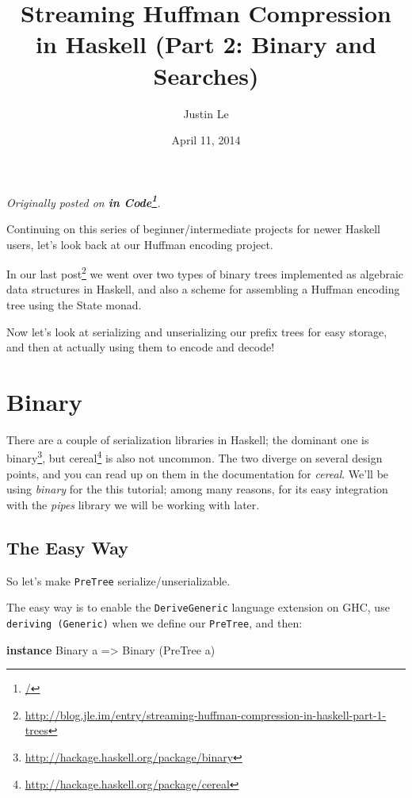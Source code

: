 \documentclass[]{article}
\title{Streaming Huffman Compression in Haskell (Part 2: Binary and Searches)}
\author{Justin Le}
\date{April 11, 2014}
\newenvironment{Shaded}{}{}
\newcommand{\KeywordTok}[1]{\textcolor[rgb]{0.00,0.44,0.13}{\textbf{{#1}}}}
\newcommand{\DataTypeTok}[1]{\textcolor[rgb]{0.56,0.13,0.00}{{#1}}}
\newcommand{\OtherTok}[1]{\textcolor[rgb]{0.00,0.44,0.13}{{#1}}}
\newcommand{\NormalTok}[1]{{#1}}
\renewcommand{\href}[2]{#2\footnote{\url{#1}}}
\begin{document}
\maketitle

\emph{Originally posted on \textbf{\href{/}{in Code}}.}

Continuing on this series of beginner/intermediate projects for newer
Haskell users, let's look back at our Huffman encoding project.

In our
\href{http://blog.jle.im/entry/streaming-huffman-compression-in-haskell-part-1-trees}{last
post} we went over two types of binary trees implemented as algebraic
data structures in Haskell, and also a scheme for assembling a Huffman
encoding tree using the State monad.

Now let's look at serializing and unserializing our prefix trees for
easy storage, and then at actually using them to encode and decode!

\section{Binary}\label{binary}

There are a couple of serialization libraries in Haskell; the dominant
one is \href{http://hackage.haskell.org/package/binary}{binary}, but
\href{http://hackage.haskell.org/package/cereal}{cereal} is also not
uncommon. The two diverge on several design points, and you can read up
on them in the documentation for \emph{cereal}. We'll be using
\emph{binary} for the this tutorial; among many reasons, for its easy
integration with the \emph{pipes} library we will be working with later.

\subsection{The Easy Way}\label{the-easy-way}

So let's make \texttt{PreTree} serialize/unserializable.

The easy way is to enable the \texttt{DeriveGeneric} language extension
on GHC, use \texttt{deriving\ (Generic)} when we define our
\texttt{PreTree}, and then:

\begin{Shaded}
\begin{Highlighting}[]
\KeywordTok{instance} \DataTypeTok{Binary} \NormalTok{a }\OtherTok{=>} \DataTypeTok{Binary} \NormalTok{(}\DataTypeTok{PreTree} \NormalTok{a)}
\end{Highlighting}
\end{Shaded}
\end{document}
